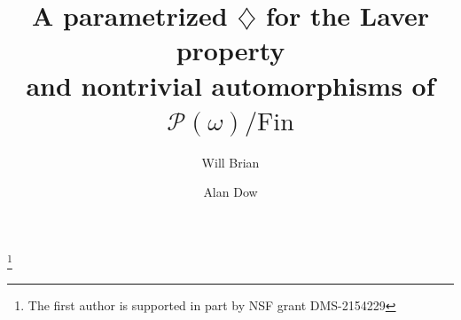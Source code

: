 \documentclass[11pt,leqno]{amsart}
\theoremstyle{definition}
\theoremstyle{remark}
\newcommand{\<}{\langle}
\renewcommand{\>}{\rangle}
\newcommand{\0}{\emptyset}
\newcommand{\1}{1\hspace{-1.75mm}1}
\newcommand{\dLP}{\diamondsuit(\mathsf{LP})}
\begin{document}
\title[$\dLP$ and nontrivial automorphisms of $\mathcal P(\omega)/\mathrm{Fin}$]{A parametrized $\diamondsuit$ for the Laver property \\ and nontrivial automorphisms of $\mathcal P(\omega)/\mathrm{Fin}$}
\author{Will Brian}
\address {
W. R. Brian\\
Department of Mathematics and Statistics\\
University of North Carolina at Charlotte\\
Charlotte, NC %
(USA)}
\author{Alan Dow}
\address {
A. S. Dow\\
Department of Mathematics and Statistics\\
University of North Carolina at Charlotte\\
Charlotte, NC %
(USA)}




\thanks{The first author is supported in part by NSF grant DMS-2154229}
\end{document}
